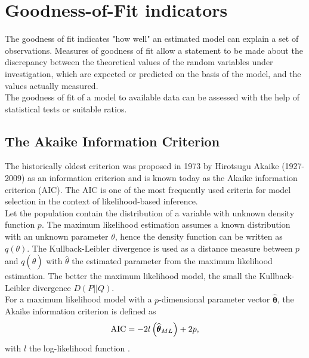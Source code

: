 \section{Goodness-of-Fit indicators}
The goodness of fit indicates "how well" an estimated model can explain a set of observations. Measures of goodness of fit allow a statement to be made about the discrepancy between the theoretical values of the random variables under investigation, which are expected or predicted on the basis of the model, and the values actually measured. \\
The goodness of fit of a model to available data can be assessed with the help of statistical tests or suitable ratios.
\subsection{The Akaike Information Criterion}
The historically oldest criterion was proposed in 1973 by Hirotsugu Akaike (1927-2009) as an information criterion and is known today as the Akaike information criterion (AIC). The AIC is one of the most frequently used criteria for model selection in the context of likelihood-based inference.  \\
Let the population contain the distribution of a variable with unknown density function $p$. The maximum likelihood estimation assumes a known distribution with an unknown parameter $\theta$, hence the density function can be written as $q\left(\theta\right)$. The Kullback-Leibler divergence is used as a distance measure between $p$ and $q\left(\widehat{\theta}\right)$ with $\widehat{\theta}$ the estimated parameter from the maximum likelihood estimation. The better the maximum likelihood model, the small the Kullback-Leibler divergence $D\left(P||Q\right)$. \\
For a maximum likelihood model with a $p$-dimensional parameter vector $\widehat{\pmb{\theta}}$, the Akaike information criterion is defined as
\begin{equation}
    \hbox{AIC}=-2l\left(\widehat{\pmb{\theta}}_{ML}\right)+2p,
\end{equation}
with $l$ the log-likelihood function \autocite[][]{akaike1974new}.
